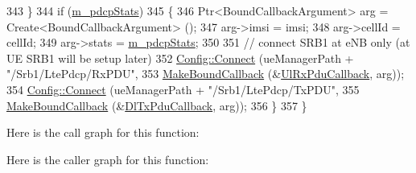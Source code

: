 \begin{DoxyCode}
343     \}
344   \textcolor{keywordflow}{if} (\hyperlink{classns3_1_1RadioBearerStatsConnector_a984690769317e9eddba15e49170f10d9}{m\_pdcpStats})
345     \{
346       Ptr<BoundCallbackArgument> arg = Create<BoundCallbackArgument> ();
347       arg->imsi = imsi;
348       arg->cellId = cellId; 
349       arg->stats = \hyperlink{classns3_1_1RadioBearerStatsConnector_a984690769317e9eddba15e49170f10d9}{m\_pdcpStats};
350 
351       \textcolor{comment}{// connect SRB1 at eNB only (at UE SRB1 will be setup later)}
352       \hyperlink{group__config_ga4014f151241cd0939b6cb64409605736}{Config::Connect} (ueManagerPath + \textcolor{stringliteral}{"/Srb1/LtePdcp/RxPDU"},
353                        \hyperlink{group__makeboundcallback_ga1725d6362e6065faa0709f7c93f8d770}{MakeBoundCallback} (&\hyperlink{namespacens3_a269527c03607c9c885d7cff7667ec5e0}{UlRxPduCallback}, arg));
354       \hyperlink{group__config_ga4014f151241cd0939b6cb64409605736}{Config::Connect} (ueManagerPath + \textcolor{stringliteral}{"/Srb1/LtePdcp/TxPDU"},
355                        \hyperlink{group__makeboundcallback_ga1725d6362e6065faa0709f7c93f8d770}{MakeBoundCallback} (&\hyperlink{namespacens3_a7de82f7ed9986b9bcb67951f61e02ff4}{DlTxPduCallback}, arg));
356     \}
357 \}
\end{DoxyCode}


Here is the call graph for this function\+:




Here is the caller graph for this function\+:


